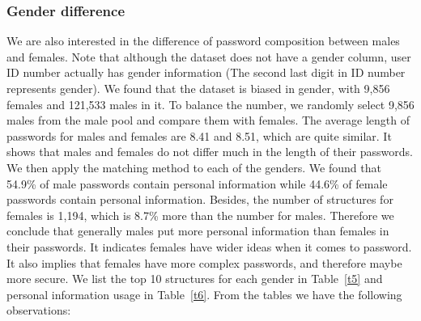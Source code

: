 \documentclass{sig-alternate}
\begin{document}
\subsubsection{Gender difference}
\label{genderdifference}
We are also interested in the difference of password composition between males and females. Note that although the dataset does not have a gender column, user ID number actually has gender information (The second last digit in ID number represents gender). We found that the dataset is biased in gender, with 9,856 females and 121,533 males in it. To balance the number, we randomly select 9,856 males from the male pool and compare them with females. The average length of passwords for males and females are 8.41 and 8.51, which are quite similar. It shows that males and females do not differ much in the length of their passwords. We then apply the matching method to each of the genders. We found that 54.9\% of male passwords contain personal information while 44.6\% of female passwords contain personal information. Besides, the number of structures for females is 1,194, which is 8.7\% more than the number for males. Therefore we conclude that generally males put more personal information than females in their passwords. It indicates females have wider ideas when it comes to password. It also implies that females have more complex passwords, and therefore maybe more secure. We list the top 10 structures for each gender in Table~\ref{t5} and personal information usage in Table~\ref{t6}. From the tables we have the following observations:
\end{document}
